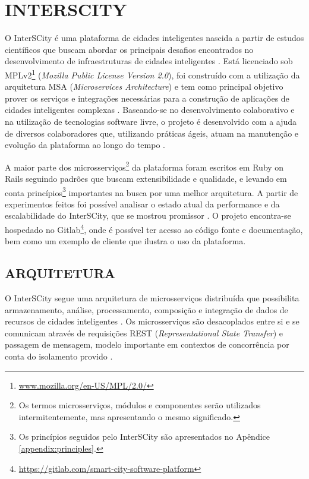 \chapter[INTERSCITY]{INTERSCITY}
\label{chapter:interscity}

O InterSCity é uma plataforma de cidades inteligentes nascida a partir de
estudos científicos que buscam abordar os principais desafios encontrados
no desenvolvimento de infraestruturas de cidades inteligentes \cite{nof2016}.
Está licenciado sob
MPLv2\footnote{\url{www.mozilla.org/en-US/MPL/2.0/}} (\textit{Mozilla Public License
Version 2.0}), foi construído com a
utilização da arquitetura MSA (\textit{Microservices Architecture}) e tem como principal
objetivo prover os serviços e integrações necessárias para a construção de
aplicações de cidades inteligentes complexas \cite{delesposte2017}. Baseando-se
no desenvolvimento colaborativo e na utilização de tecnologias software livre,
o projeto é desenvolvido com a ajuda de diversos colaboradores que, utilizando
práticas ágeis, atuam na manutenção e evolução da plataforma ao longo do tempo
\cite{delesposte2017}.

A maior parte dos microsserviços\footnote{Os termos microsserviços, módulos e
componentes serão utilizados intermitentemente, mas apresentando o mesmo
significado.} da plataforma foram escritos em Ruby on Rails
seguindo padrões que buscam extensibilidade e qualidade, e levando em conta
princípios\footnote{Os princípios seguidos pelo InterSCity são apresentados no
Apêndice \ref{appendix:principles}.} importantes na busca por uma melhor arquitetura.
A partir de experimentos feitos foi possível analisar
o estado atual da performance e da escalabilidade do InterSCity, que se mostrou
promissor \cite{delesposte2017}. O projeto encontra-se hospedado no
Gitlab\footnote{\url{https://gitlab.com/smart-city-software-platform}},
onde é possível ter acesso ao código fonte e documentação, bem como um exemplo de
cliente que ilustra o uso da plataforma.

\section{ARQUITETURA}
\label{sec:architecture}

O InterSCity segue uma arquitetura de microsserviços distribuída que
possibilita armazenamento, análise, processamento, composição e integração de
dados de recursos de cidades inteligentes \cite{delesposte2017}. Os
microsserviços são desacoplados entre si e se comunicam através de requisições REST
(\textit{Representational State Transfer}) e passagem de mensagem, modelo importante em
contextos de concorrência por conta do isolamento provido \cite{armstrong2003}.

